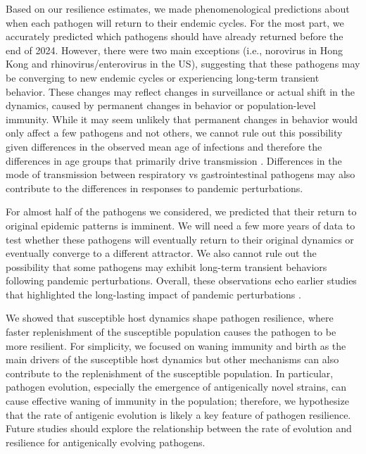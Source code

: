 \documentclass[12pt]{article}
\begin{document}
Based on our resilience estimates, we made phenomenological predictions about when each pathogen will return to their endemic cycles.
For the most part, we accurately predicted which pathogens should have already returned before the end of 2024.
However, there were two main exceptions (i.e., norovirus in Hong Kong and rhinovirus/enterovirus in the US), suggesting that these pathogens may be converging to new endemic cycles or experiencing long-term transient behavior.
These changes may reflect changes in surveillance or actual shift in the dynamics, caused by permanent changes in behavior or population-level immunity.
While it may seem unlikely that permanent changes in behavior would only affect a few pathogens and not others, we cannot rule out this possibility given differences in the observed mean age of infections and therefore the differences in age groups that primarily drive transmission \citep{radin2014epidemiology,lv2024epidemiological}.
Differences in the mode of transmission between respiratory vs gastrointestinal pathogens may also contribute to the differences in responses to pandemic perturbations.

For almost half of the pathogens we considered, we predicted that their return to original epidemic patterns is imminent.
We will need a few more years of data to test whether these pathogens will eventually return to their original dynamics or eventually converge to a different attractor.
We also cannot rule out the possibility that some pathogens may exhibit long-term transient behaviors following pandemic perturbations.
Overall, these observations echo earlier studies that highlighted the long-lasting impact of pandemic perturbations \citep{baker2022long,caini2024probable,chen2024covid,park2024predicting,nielsen2025complex}. 

We showed that susceptible host dynamics shape pathogen resilience, where faster replenishment of the susceptible population causes the pathogen to be more resilient.
For simplicity, we focused on waning immunity and birth as the main drivers of the susceptible host dynamics but other mechanisms can also contribute to the replenishment of the susceptible population.
In particular, pathogen evolution, especially the emergence of antigenically novel strains, can cause effective waning of immunity in the population;
therefore, we hypothesize that the rate of antigenic evolution is likely a key feature of pathogen resilience.
Future studies should explore the relationship between the rate of evolution and resilience for antigenically evolving pathogens.
\end{document}
